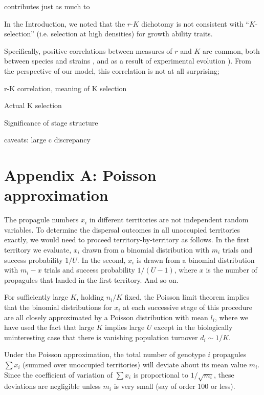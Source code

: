 \documentclass[11pt]{article}
\begin{document}
contributes just as much to



In the Introduction, we noted that the $r$-$K$ dichotomy is not consistent with ``$K$-selection'' (i.e. selection at high densities) for growth ability traits. 

Specifically, positive correlations between measures of $r$ and $K$ are common, both between species and strains \citep{luckinbill_1979,kuno_1991,hendriks_2005,fitzsimmons_2010}, and as a result of experimental evolution \citep{luckinbill_1979,luckinbill_1978}). From the perspective of our model, this correlation is not at all surprising;  



r-K correlation, meaning of K selection

Actual K selection

Significance of stage structure

caveats: large c discrepancy




 

\section*{Appendix A: Poisson approximation}

The propagule numbers $x_i$ in different territories are not independent random variables. To determine the dispersal outcomes in all unoccupied territories exactly, we would need to proceed territory-by-territory as follows. In the first territory we evaluate, $x_i$ drawn from a binomial distribution with $m_i$ trials and success probability $1/U$. In the second, $x_i$ is drawn from a binomial distribution with $m_i-x$ trials and success probability $1/(U-1)$, where $x$ is the number of propagules that landed in the first territory. And so on.

For sufficiently large $K$, holding $n_i/K$ fixed, the Poisson limit theorem implies that the binomial distributions for $x_i$ at each successive stage of this procedure are all closely approximated by a Poisson distribution with mean $l_i$, where we have used the fact that large $K$ implies large $U$ except in the biologically uninteresting case that there is vanishing population turnover $d_i \sim 1/K$. 

Under the Poisson approximation, the total number of genotype $i$ propagules $\sum x_i$ (summed over unoccupied territories) will deviate about its mean value $m_i$. Since the coefficient of variation of $\sum x_i$ is proportional to $1/\sqrt{m_i}$, these deviations are negligible unless $m_i$ is very small (say of order $100$ or less).
\end{document}

